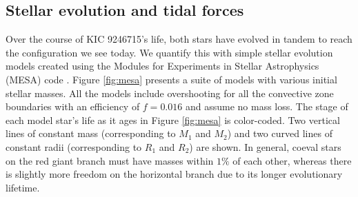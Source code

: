 \subsection{Stellar evolution and tidal forces}\label{tides}
Over the course of KIC 9246715's life, both stars have evolved in tandem to reach the configuration we see today. We quantify this with simple stellar evolution models created using the Modules for Experiments in Stellar Astrophysics (MESA) code \citep{pax11,pax13,pax15}. Figure \ref{fig:mesa} presents a suite of models with various initial stellar masses. All the models include overshooting for all the convective zone boundaries with an efficiency of $f = 0.016$ \citep{her00} and assume no mass loss. The stage of each model star's life as it ages in Figure \ref{fig:mesa} is color-coded. Two vertical lines of constant mass (corresponding to $M_1$ and $M_2$) and two curved lines of constant radii (corresponding to $R_1$ and $R_2$) are shown. In general, coeval stars on the red giant branch must have masses within $1\%$ of each other, whereas there is slightly more freedom on the horizontal branch due to its longer evolutionary lifetime.

